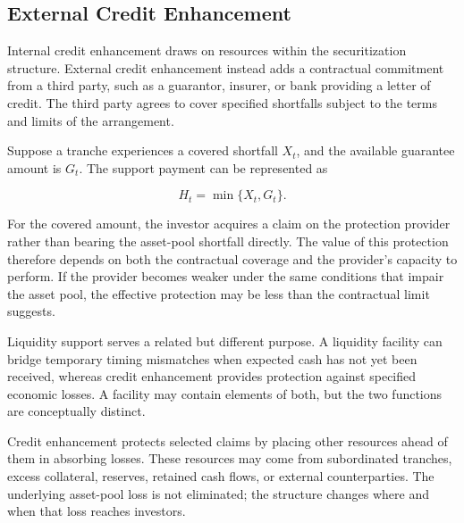 \subsection{External Credit Enhancement}

Internal credit enhancement draws on resources within the securitization structure. External credit enhancement instead adds a contractual commitment from a third party, such as a guarantor, insurer, or bank providing a letter of credit. The third party agrees to cover specified shortfalls subject to the terms and limits of the arrangement.

Suppose a tranche experiences a covered shortfall \(X_t\), and the available guarantee amount is \(G_t\). The support payment can be represented as

\begin{equation}
H_t
=
\min\{X_t,G_t\}.
\label{eq:ch20-guarantee-payment}
\end{equation}

For the covered amount, the investor acquires a claim on the protection provider rather than bearing the asset-pool shortfall directly. The value of this protection therefore depends on both the contractual coverage and the provider's capacity to perform. If the provider becomes weaker under the same conditions that impair the asset pool, the effective protection may be less than the contractual limit suggests.

Liquidity support serves a related but different purpose. A liquidity facility can bridge temporary timing mismatches when expected cash has not yet been received, whereas credit enhancement provides protection against specified economic losses. A facility may contain elements of both, but the two functions are conceptually distinct.

\begin{tcolorbox}[
  enhanced,
  breakable,
  colback=white,
  colframe=FinanceBlue,
  boxrule=0.7pt,
  sharp corners,
  borderline west={2.2pt}{0pt}{FinanceBlue},
  title=\textbf{Financial Perspective: Credit Enhancement Redistributes Loss-Bearing Capacity},
  coltitle=white,
  colbacktitle=FinanceBlue,
  fonttitle=\bfseries,
  before skip=1.2em,
  after skip=1.2em
]

Credit enhancement protects selected claims by placing other resources ahead of them in absorbing losses. These resources may come from subordinated tranches, excess collateral, reserves, retained cash flows, or external counterparties. The underlying asset-pool loss is not eliminated; the structure changes where and when that loss reaches investors.

\end{tcolorbox}

